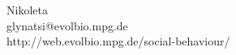 \documentclass{beamer}
\begin{document}
    \begin{frame}
        \centering
        
    \end{frame}

    \begin{frame}
        \centering
        
    \end{frame}

    \begin{frame}
    \centering

    Nikoleta \\ glynatsi@evolbio.mpg.de \\

    \vspace{1cm}
    \small{http://web.evolbio.mpg.de/social-behaviour/}
    
    \end{frame}
\end{document}
